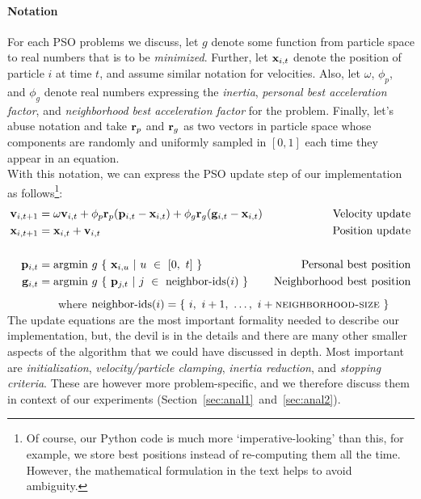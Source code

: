 \documentclass[a4paper,final,9pt]{article}
\begin{document}
\paragraph{Notation}
For each PSO problems we discuss, let $g$ denote some function from
particle space to real numbers that is to be \emph{minimized}. Further, let
$\mathbf{x}_{i,t}$ denote the position of particle $i$ at time $t$, and assume
similar notation for velocities.  Also, let $\omega$, $\phi_p$, and
$\phi_g$ denote real numbers expressing the \emph{inertia}, \emph{personal
best acceleration factor}, and \emph{neighborhood best acceleration factor}
for the problem.  Finally, let's abuse notation and take $\mathbf{r}_p$ and
$\mathbf{r}_g$ as two vectors in particle space whose components are randomly and
uniformly sampled in $[0, 1]$ each time they appear in an equation.
\ \\

\noindent
With this notation, we can express the PSO update step of our implementation
as follows\footnote{Of course, our Python code is much more
`imperative-looking' than this, for example, we store best positions instead
of re-computing them all the time. However, the mathematical formulation in
the text helps to avoid ambiguity.}:
\begin{align*}
  \mathbf{v}_{i,t+1} &= 
    \omega \mathbf{v}_{i,t} 
    + \phi_p \mathbf{r}_p (\mathbf{p}_{i,t} - \mathbf{x}_{i,t})
    + \phi_g \mathbf{r}_g (\mathbf{g}_{i,t} - \mathbf{x}_{i,t}) &
    \text{Velocity update} \\
  \mathbf{x}_{i,t+1} &= \mathbf{x}_{i,t} + \mathbf{v}_{i,t} & \text{Position update} \\
  \ \\
  \mathbf{p}_{i,t} &= \text{argmin}~g~\{~\mathbf{x}_{i,u}~|~u~\in~[0,~t]~\} 
    & \text{Personal best position} \\
  \mathbf{g}_{i,t} &= \text{argmin}~g~\{~\mathbf{p}_{j,t}~|~j~\in~\text{neighbor-ids}(i)~\} 
    & \text{Neighborhood best position} 
\end{align*}
~~~~~~~~~where $\text{neighbor-ids}(i) =
\{~i,~i+1,~\ldots,~i+\textsc{neighborhood-size}~\}$
\ \\

\noindent
The update equations are the most important formality needed to describe our
implementation, but, the devil is in the details and there are many
other smaller aspects of the algorithm that we could have discussed in depth.
Most important are \emph{initialization}, \emph{velocity/particle clamping},
\emph{inertia reduction}, and \emph{stopping criteria}. These are however more
problem-specific, and we therefore discuss them in context of our experiments
(Section~\ref{sec:anal1}~and~\ref{sec:anal2}).
\end{document}
